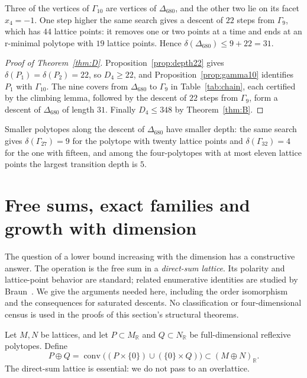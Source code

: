 \documentclass[manuscript]{aomart}
\theoremstyle{definition}
\theoremstyle{remark}
\newcommand{\R}{\mathbb{R}}
\newcommand{\conv}{\operatorname{conv}}
\newcommand{\Dbig}{\Delta_{680}}
\newcommand{\UB}{348}
\newcommand{\LB}{22}
\newcommand{\DUB}{31}
\begin{document}
Three of the vertices of $\Gamma_{10}$ are vertices of $\Dbig$, and the
other two lie on its facet $x_4=-1$. One step higher the same search gives
a descent of $22$ steps from $\Gamma_9$, which has $44$ lattice points: it
removes one or two points at a time and ends at an r-minimal polytope with
$19$ lattice points. Hence $\delta(\Dbig)\le9+22=\DUB$.

\begin{proof}[Proof of Theorem~\ref{thm:D}]
Proposition~\ref{prop:depth22} gives $\delta(P_1)=\delta(P_2)=\LB$, so
$D_4\ge\LB$, and Proposition~\ref{prop:gamma10} identifies $P_1$ with
$\Gamma_{10}$. The nine covers from $\Dbig$ to $\Gamma_9$ in
Table~\ref{tab:chain}, each certified by the climbing lemma,
followed by the descent of $22$ steps from $\Gamma_9$, form a descent of
$\Dbig$ of length $\DUB$. Finally $D_4\le\UB$ by Theorem~\ref{thm:B}.
\end{proof}

Smaller polytopes along the descent of $\Dbig$ have smaller depth: the
same search gives $\delta(\Gamma_{27})=9$ for the polytope with twenty
lattice points and $\delta(\Gamma_{32})=4$ for the one with fifteen, and
among the four-polytopes with at most eleven lattice points the largest
transition depth is $5$.

\section{Free sums, exact families and growth with dimension}\label{sec:freesums}
The question of a lower bound increasing with the dimension has a
constructive answer. The operation is the free sum in a \emph{direct-sum
lattice}. Its polarity and lattice-point behavior are standard; related
enumerative identities are studied by Braun~\cite{Braun06}. We give the
arguments needed here, including the order isomorphism and the consequences
for saturated descents. No classification or four-dimensional census is
used in the proofs of this section's structural theorems.

Let $M,N$ be lattices, and let $P\subset M_\R$ and $Q\subset N_\R$
be full-dimensional reflexive polytopes. Define
\[
 P\oplus Q=\conv\bigl((P\times\{0\})\cup(\{0\}\times Q)\bigr)
 \subset (M\oplus N)_\R.
\]
The direct-sum lattice is essential: we do not pass to an overlattice.
\end{document}

